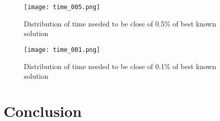 \documentclass[a4paper,10pt]{article}
\begin{document}
	\begin{figure}[H]
		\centering
		\caption{Distribution of time needed to be close of 0.5\% of best known solution}
		\texttt{[image: time\_005.png]}
	\end{figure}

	\begin{figure}[H]
		\centering
		\caption{Distribution of time needed to be close of 0.1\% of best known solution}
		\texttt{[image: time\_001.png]}
	\end{figure}


\section{Conclusion}




\end{document}
